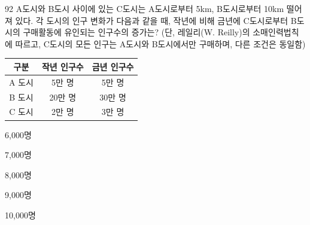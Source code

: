 \begin{question}{92}
A도시와 B도시 사이에 있는 C도시는 A도시로부터 5km, B도시로부터 10km 떨어져 있다. 각 도시의 인구 변화가 다음과 같을 때, 작년에 비해 금년에 C도시로부터 B도시의 구매활동에 유인되는 인구수의 증가는? (단, 레일리(W. Reilly)의 소매인력법칙에 따르고, C도시의 모든 인구는 A도시와 B도시에서만 구매하며, 다른 조건은 동일함)

{\small\centering\renewcommand{\arraystretch}{1.4}
\begin{tabular}{|c|c|c|}\hline
구분 & 작년 인구수 & 금년 인구수 \\ \hline
A 도시 & 5만 명 & 5만 명 \\ \hline
B 도시 & 20만 명 & 30만 명 \\ \hline
C 도시 & 2만 명 & 3만 명 \\ \hline
\end{tabular}\par}
\begin{choices}
  \item 6,000명
  \item 7,000명
  \item 8,000명
  \item 9,000명
  \item 10,000명
\end{choices}
\end{question}
